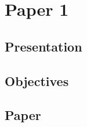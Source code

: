 \chapter{Paper 1}%
\label{ch:paper1}

\section{Presentation}

\lipsum[21]

\section{Objectives}

\lipsum[22]

\section{Paper}

\lipsum[23]
